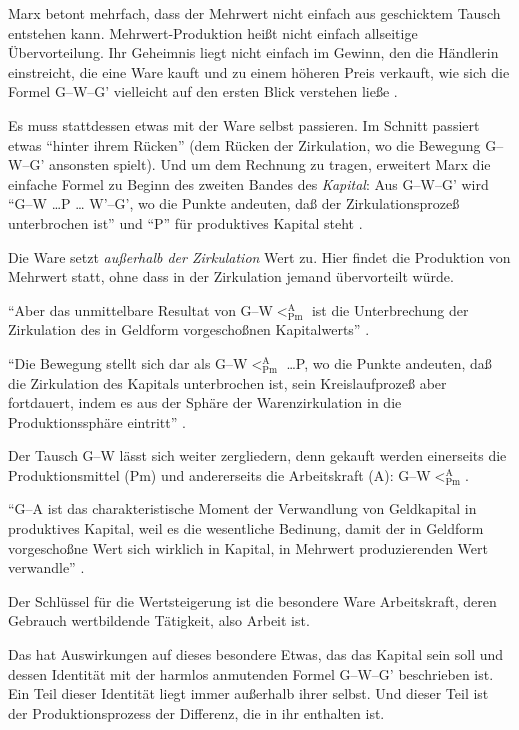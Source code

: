 \documentclass[12pt,
               DIV13,
               paper=a4,
               twoside=false,
               onehalfspacing,
               bibliography=totoc,
               toc=graduated,
               draft,
               ]{scrartcl}
\newcommand{\pc}[2]{\parencite[#1]{#2}}
\newcommand{\vgl}[2]{\parencite[vgl.][#1]{#2}}
\newcommand{\gwg}{G--W--G'\xspace}
\newcommand{\gwapm}{G--W$<^{\text{A}}_{\text{Pm}}$\xspace}
\newcommand{\gwapmp}{G--W$<^{\text{A}}_{\text{Pm}}$ \dots P\xspace}
\begin{document}
Marx betont mehrfach, dass der Mehrwert nicht einfach aus geschicktem
Tausch entstehen kann. Mehrwert-Produktion heißt nicht einfach
allseitige Übervorteilung. Ihr Geheimnis liegt nicht
einfach im Gewinn, den die Händlerin einstreicht, die eine Ware kauft
und zu einem höheren Preis verkauft, wie sich die Formel \gwg
vielleicht auf den ersten Blick verstehen ließe
\parencites[vgl.][170-181]{kap}[66]{kap2}.

Es muss stattdessen etwas mit der Ware selbst passieren. Im Schnitt
passiert etwas "`hinter ihrem Rücken"' \pc{181}{kap} (dem Rücken der
Zirkulation, wo die Bewegung \gwg ansonsten spielt). Und um dem
Rechnung zu tragen, erweitert Marx die einfache Formel zu Beginn des
zweiten Bandes des \emph{Kapital}: Aus \gwg wird "`G--W \dots P \dots
W'--G', wo die Punkte andeuten, daß der Zirkulationsprozeß
unterbrochen ist"' \pc{31}{kap2} und "`P"' für produktives Kapital
steht \vgl{34}{kap2}.

Die Ware setzt \emph{außerhalb der Zirkulation} Wert zu. Hier findet
die Produktion von Mehrwert statt, ohne dass in der Zirkulation jemand
übervorteilt würde.

"`Aber das unmittelbare Resultat von \gwapm ist die Unterbrechung der
Zirkulation des in Geldform vorgeschoßnen Kapitalwerts"'
\pc{40}{kap2}.

"`Die Bewegung stellt sich dar als \gwapmp, wo die Punkte andeuten,
daß die Zirkulation des Kapitals unterbrochen ist, sein
Kreislaufprozeß aber fortdauert, indem es aus der Sphäre der
Warenzirkulation in die Produktionssphäre eintritt"' \pc{40}{kap2}.

Der Tausch G--W lässt sich weiter zergliedern, denn gekauft werden
einerseits die Produktionsmittel (Pm) und andererseits die
Arbeitskraft (A): \gwapm.

"`G--A ist das charakteristische Moment der Verwandlung von
Geldkapital in produktives Kapital, weil es die wesentliche Bedinung,
damit der in Geldform vorgeschoßne Wert sich wirklich in Kapital, in
Mehrwert produzierenden Wert verwandle"' \pc{35}{kap2}.

Der Schlüssel für die Wertsteigerung ist die besondere Ware
Arbeitskraft, deren Gebrauch wertbildende Tätigkeit, also Arbeit ist.

Das hat Auswirkungen auf dieses besondere Etwas, das das Kapital sein
soll und dessen Identität mit der harmlos anmutenden Formel \gwg
beschrieben ist. Ein Teil dieser Identität liegt immer außerhalb ihrer
selbst. Und dieser Teil ist der Produktionsprozess der Differenz, die
in ihr enthalten ist.
\end{document}
